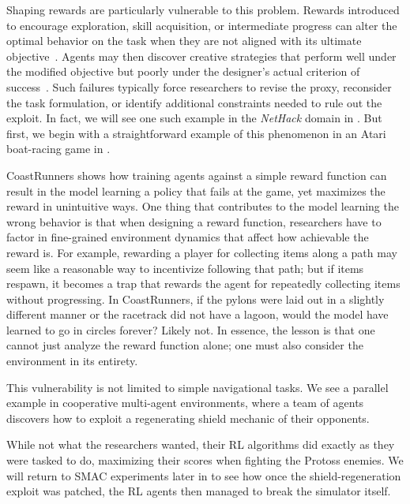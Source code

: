 \documentclass[10pt]{article}
\def\citep#1{}%
\begin{document}
Shaping rewards are particularly vulnerable to this problem.
Rewards introduced to encourage exploration, skill acquisition, or intermediate progress can alter the optimal behavior on the task when they are not aligned with its ultimate objective~\citep{NgPolicyInvariance1999}.
Agents may then discover creative strategies that perform well under the modified objective but poorly under the designer's actual criterion of success~\citep{pan2022effectsrewardmisspecificationmapping, specgamingkrakovna2020, amodei2016concrete}.
Such failures typically force researchers to revise the proxy, reconsider the task formulation, or identify additional constraints needed to rule out the exploit. 
In fact, we will see one such example in the \textit{NetHack} domain in . 
But first, we begin with a straightforward example of this phenomenon in an Atari boat-racing game in .



CoastRunners shows how training agents against a simple reward function can result in the model learning a policy that fails at the game, yet maximizes the reward in unintuitive ways.
One thing that contributes to the model learning the wrong behavior is that when designing a reward function, researchers have to factor in fine-grained environment dynamics that affect how achievable the reward is.
For example, rewarding a player for collecting items along a path may seem like a reasonable way to incentivize following that path; but if items respawn, it becomes a trap that rewards the agent for repeatedly collecting items without progressing.
In CoastRunners, if the pylons were laid out in a slightly different manner or the racetrack did not have a lagoon, would the model have learned to go in circles forever? Likely not.
In essence, the lesson is that one cannot just analyze the reward function alone; one must also consider the environment in its entirety.

This vulnerability is not limited to simple navigational tasks.
We see a parallel example in cooperative multi-agent environments, where a team of agents discovers how to exploit a regenerating shield mechanic of their opponents.



While not what the researchers wanted, their RL algorithms did exactly as they were tasked to do, maximizing their scores when fighting the Protoss enemies.
We will return to SMAC experiments later in  to see how once the shield-regeneration exploit was patched, the RL agents then managed to break the simulator itself.
\end{document}
